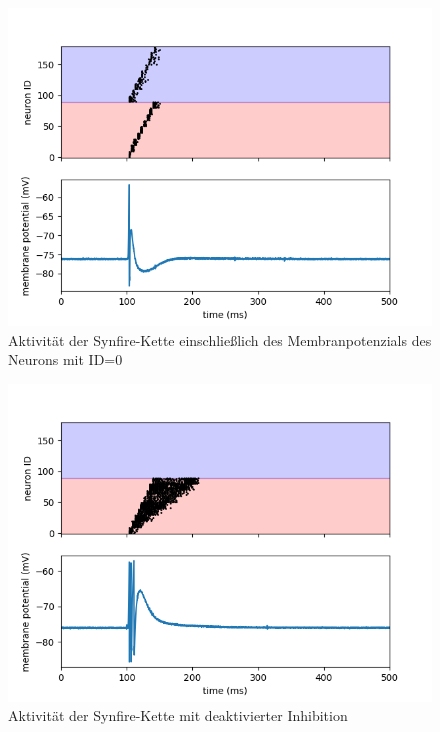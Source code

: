 \documentclass[10pt,a4paper]{scrartcl}
\begin{document}
\begin{figure} [ht]
\begin{center}
\label{fig:abb4}
\caption{Aktivität der Synfire-Kette einschließlich des Membranpotenzials des Neurons mit ID=0}
\includegraphics[scale=0.35]{pictures/task1_synfire_chain.png}
\end{center}
\end{figure}

\begin{figure} [ht]
\begin{center}
\label{fig:abb4}
\caption{Aktivität der Synfire-Kette mit deaktivierter Inhibition}
\includegraphics[scale=0.35]{pictures/synfire_chain_disable_inhibition.png}
\end{center}
\end{figure}
\end{document}
